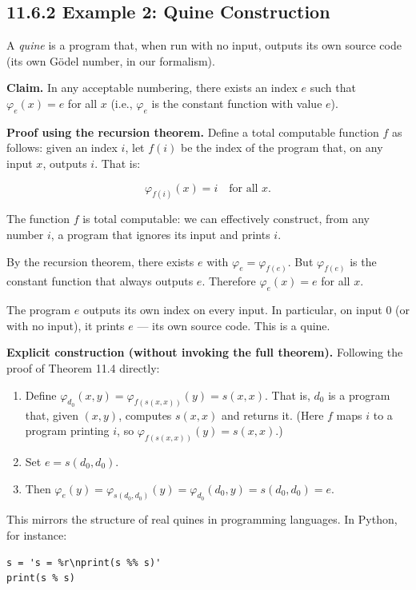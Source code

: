\subsection{11.6.2 Example 2: Quine Construction}

A \textit{quine} is a program that, when run with no input, outputs its own source code (its own Gödel number, in our formalism).

\textbf{Claim.} In any acceptable numbering, there exists an index $e$ such that $\varphi_e(x) = e$ for all $x$ (i.e., $\varphi_e$ is the constant function with value $e$).

\textbf{Proof using the recursion theorem.} Define a total computable function $f$ as follows: given an index $i$, let $f(i)$ be the index of the program that, on any input $x$, outputs $i$. That is:

\[\varphi_{f(i)}(x) = i \quad \text{for all } x.\]

The function $f$ is total computable: we can effectively construct, from any number $i$, a program that ignores its input and prints $i$.

By the recursion theorem, there exists $e$ with $\varphi_e = \varphi_{f(e)}$. But $\varphi_{f(e)}$ is the constant function that always outputs $e$. Therefore $\varphi_e(x) = e$ for all $x$.

The program $e$ outputs its own index on every input. In particular, on input 0 (or with no input), it prints $e$ --- its own source code. This is a quine. 

\textbf{Explicit construction (without invoking the full theorem).} Following the proof of Theorem 11.4 directly:

\begin{enumerate}
\item Define $\varphi_{d_0}(x, y) = \varphi_{f(s(x,x))}(y) = s(x, x)$. That is, $d_0$ is a program that, given $(x, y)$, computes $s(x, x)$ and returns it. (Here $f$ maps $i$ to a program printing $i$, so $\varphi_{f(s(x,x))}(y) = s(x,x)$.)
\item Set $e = s(d_0, d_0)$.
\item Then $\varphi_e(y) = \varphi_{s(d_0, d_0)}(y) = \varphi_{d_0}(d_0, y) = s(d_0, d_0) = e$.
\end{enumerate}

This mirrors the structure of real quines in programming languages. In Python, for instance:

\begin{verbatim}
s = 's = %r\nprint(s %% s)'
print(s % s)
\end{verbatim}

